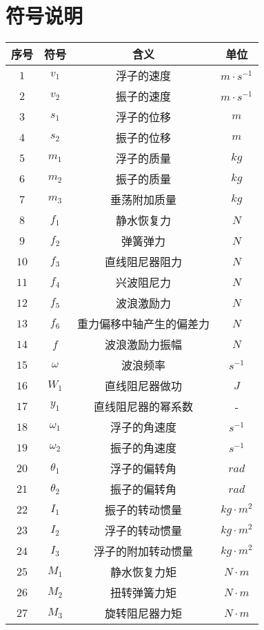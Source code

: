 \documentclass[a4paper,12pt]{article}
\begin{document}
	\section{符号说明}
	\setlength\LTleft{0pt}
	\setlength{\tabcolsep}{25pt}
	\begin{longtable}{cccc}
		\\\hline
		\textbf{序号}&\textbf{符号}&\textbf{含义}&\textbf{单位}\\
		\hline
		$1$&$v_1$&浮子的速度&$m\cdot s^{-1}$\\\hline
		$2$&$v_2$&振子的速度&$m\cdot s^{-1}$\\\hline
		$3$&$s_1$&浮子的位移&$m$\\\hline
		$4$&$s_2$&振子的位移&$m$\\\hline
		$5$&$m_1$&浮子的质量&$kg$\\\hline
		$6$&$m_2$&振子的质量&$kg$\\\hline
		$7$&$m_3$&垂荡附加质量&$kg$\\\hline
		$8$&$f_1$&静水恢复力&$N$\\\hline
		$9$&$f_2$&弹簧弹力&$N$\\\hline
		$10$&$f_3$&直线阻尼器阻力&$N$\\\hline
		$11$&$f_4$&兴波阻尼力&$N$\\\hline
		$12$&$f_5$&波浪激励力&$N$\\\hline
		$13$&$f_6$&重力偏移中轴产生的偏差力&$N$\\\hline
		$14$&$f$&波浪激励力振幅&$N$\\\hline 
		$15$&$\omega$&波浪频率&$s^{-1}$\\\hline 
		$16$&$W_1$&直线阻尼器做功&$J$\\\hline 
		$17$&$y_1$&直线阻尼器的幂系数&-\\\hline
		$18$&$\omega_1$&浮子的角速度&$s^{-1}$\\\hline
		$19$&$\omega_2$&振子的角速度&$s^{-1}$\\\hline
		$20$&$\theta_1$&浮子的偏转角&$rad$\\\hline
		$21$&$\theta_2$&振子的偏转角&$rad$\\\hline
		$22$&$I_1$&振子的转动惯量&$kg\cdot m^2$\\\hline
		$23$&$I_2$&浮子的转动惯量&$kg\cdot m^2$\\\hline
		$24$&$I_3$&浮子的附加转动惯量&$kg\cdot m^2$\\\hline
		$25$&$M_1$&静水恢复力矩&$N\cdot m$\\\hline 
		$26$&$M_2$&扭转弹簧力矩&$N\cdot m$\\\hline
		$27$&$M_3$&旋转阻尼器力矩&$N\cdot m$\\\hline

\end{longtable}
\end{document}
